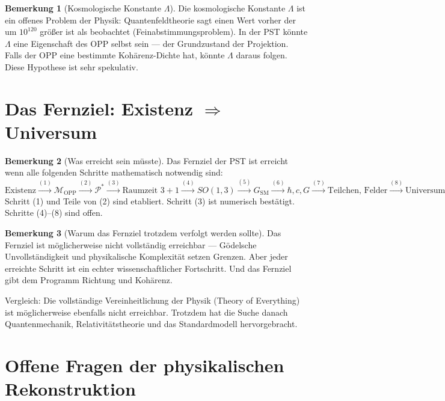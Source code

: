 \documentclass[11pt,a4paper]{article}
\theoremstyle{plain}
\theoremstyle{definition}
\newtheorem{remark}{Bemerkung}[section]
\newcommand{\OPP}{\mathcal{M}_{\mathrm{OPP}}}
\newcommand{\Proj}{\mathcal{P}}
\begin{document}
\begin{remark}[Kosmologische Konstante $\Lambda$]
Die kosmologische Konstante $\Lambda$ ist ein offenes Problem der
Physik: Quantenfeldtheorie sagt einen Wert vorher der um $10^{120}$
gr\"{o}\ss{}er ist als beobachtet (Feinabstimmungsproblem). In der PST
k\"{o}nnte $\Lambda$ eine Eigenschaft des OPP selbst sein --- der
\glqq{}Grundzustand\grqq{} der Projektion. Falls der OPP eine bestimmte
Kohärenz-Dichte hat, k\"{o}nnte $\Lambda$ daraus folgen. Diese Hypothese
ist sehr spekulativ.
\end{remark}

\section{Das Fernziel: Existenz $\Rightarrow$ Universum}

\begin{remark}[Was erreicht sein m\"{u}sste]
Das Fernziel der PST ist erreicht wenn alle folgenden Schritte
mathematisch notwendig sind:
\[
  \text{Existenz}
  \xrightarrow{(1)} \OPP
  \xrightarrow{(2)} \Proj^\ast
  \xrightarrow{(3)} \text{Raumzeit } 3{+}1
  \xrightarrow{(4)} SO(1,3)
  \xrightarrow{(5)} G_{\text{SM}}
  \xrightarrow{(6)} \hbar, c, G
  \xrightarrow{(7)} \text{Teilchen, Felder}
  \xrightarrow{(8)} \text{Universum}
\]
Schritt (1) und Teile von (2) sind etabliert. Schritt (3) ist numerisch
best\"{a}tigt. Schritte (4)--(8) sind offen.
\end{remark}

\begin{remark}[Warum das Fernziel trotzdem verfolgt werden sollte]
Das Fernziel ist m\"{o}glicherweise nicht vollst\"{a}ndig erreichbar ---
G\"{o}delsche Unvollst\"{a}ndigkeit und physikalische Komplexit\"{a}t
setzen Grenzen. Aber jeder erreichte Schritt ist ein echter
wissenschaftlicher Fortschritt. Und das Fernziel gibt dem Programm
Richtung und Koh\"{a}renz.

Vergleich: Die vollst\"{a}ndige Vereinheitlichung der Physik
(Theory of Everything) ist m\"{o}glicherweise ebenfalls nicht erreichbar.
Trotzdem hat die Suche danach Quantenmechanik, Relativit\"{a}tstheorie
und das Standardmodell hervorgebracht.
\end{remark}

\section{Offene Fragen der physikalischen Rekonstruktion}
\end{document}
